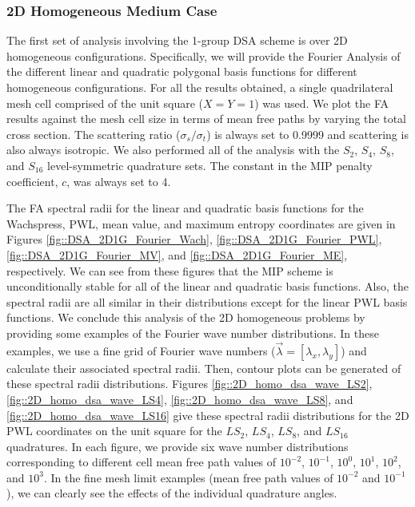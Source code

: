\subsubsection{2D Homogeneous Medium Case}
\label{sec::DSA_Results_1G_2DHomo}

The first set of analysis involving the 1-group DSA scheme is over 2D homogeneous configurations. Specifically, we will provide the Fourier Analysis of the different linear and quadratic polygonal basis functions for different homogeneous configurations. For all the results obtained, a single quadrilateral mesh cell comprised of the unit square ($X=Y=1$) was used. We plot the FA results against the mesh cell size in terms of mean free paths by varying the total cross section. The scattering ratio ($\sigma_s / \sigma_t$) is always set to 0.9999 and scattering is also always isotropic. We also performed all of the analysis with the $S_2$, $S_4$, $S_8$, and $S_{16}$ level-symmetric quadrature sets. The constant in the MIP penalty coefficient, $c$, was always set to 4.

The FA spectral radii for the linear and quadratic basis functions for the Wachspress, PWL, mean value, and maximum entropy coordinates are given in Figures \ref{fig::DSA_2D1G_Fourier_Wach}, \ref{fig::DSA_2D1G_Fourier_PWL}, \ref{fig::DSA_2D1G_Fourier_MV}, and \ref{fig::DSA_2D1G_Fourier_ME}, respectively. We can see from these figures that the MIP scheme is unconditionally stable for all of the linear and quadratic basis functions. Also, the spectral radii are all similar in their distributions except for the linear PWL basis functions. We conclude this analysis of the 2D homogeneous problems by providing some examples of the Fourier wave number distributions. In these examples, we use a fine grid of Fourier wave numbers ($\vec{\lambda}=[\lambda_x, \lambda_y]$) and calculate their associated spectral radii. Then, contour plots can be generated of these spectral radii distributions. Figures \ref{fig::2D_homo_dsa_wave_LS2}, \ref{fig::2D_homo_dsa_wave_LS4}, \ref{fig::2D_homo_dsa_wave_LS8}, and \ref{fig::2D_homo_dsa_wave_LS16} give these spectral radii distributions for the 2D PWL coordinates on the unit square for the $LS_2$, $LS_4$, $LS_8$, and $LS_{16}$ quadratures. In each figure, we provide six wave number distributions corresponding to different cell mean free path values of $10^{-2}$, $10^{-1}$, $10^0$, $10^1$, $10^2$, and $10^3$. In the fine mesh limit examples (mean free path values of $10^{-2}$ and $10^{-1}$), we can clearly see the effects of the individual quadrature angles.

